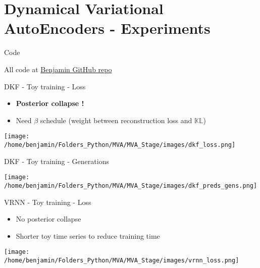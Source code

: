 \section{Dynamical Variational AutoEncoders - Experiments}\label{DVAEs and SDEs}

%
%

\begin{frame}{Code}
    \begin{tcolorbox}[colback=blue!5!white,colframe=black!75!black,title=GitHub repo]
        All code at \href{https://github.com/BenjaminDeporte/MVA_Stage}{Benjamin GitHub repo}
    \end{tcolorbox}
\end{frame}

\begin{frame}{DKF - Toy training - Loss}
    \begin{itemize}
        \item \textbf{Posterior collapse !}
        \item Need $\beta$ schedule (weight between reconstruction loss and $\mathbb{KL}$)
    \end{itemize}
    \begin{center}
        \texttt{[image: /home/benjamin/Folders\_Python/MVA/MVA\_Stage/images/dkf\_loss.png]}
    \end{center}
\end{frame}

\begin{frame}{DKF - Toy training - Generations}
    \begin{center}
    \texttt{[image: /home/benjamin/Folders\_Python/MVA/MVA\_Stage/images/dkf\_preds\_gens.png]}
    \end{center}
\end{frame}

%
%


\begin{frame}{VRNN - Toy training - Loss}
    \begin{itemize}
        \item No posterior collapse
        \item Shorter toy time series to reduce training time
    \end{itemize}
    \begin{center}
        \texttt{[image: /home/benjamin/Folders\_Python/MVA/MVA\_Stage/images/vrnn\_loss.png]}
    \end{center}
\end{frame}

